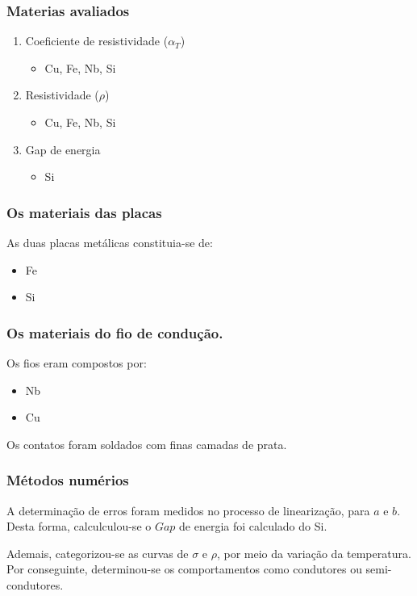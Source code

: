 \documentclass[11pt]{article}
\begin{document}
\subsubsection{Materias avaliados}
\label{sec:org3be70eb}
\begin{enumerate}
\item Coeficiente de resistividade (\(\alpha_T\))
\begin{itemize}
\item Cu, Fe, Nb, Si
\end{itemize}
\item Resistividade (\(\rho\))
\begin{itemize}
\item Cu, Fe, Nb, Si
\end{itemize}
\item Gap de energia
\begin{itemize}
\item Si
\end{itemize}
\end{enumerate}

\subsubsection{Os materiais das placas}
\label{sec:orgb54939c}
As duas placas metálicas constituia-se de:
\begin{itemize}
\item Fe
\item Si
\end{itemize}
\subsubsection{Os materiais do fio de condução.}
\label{sec:orgf1d6452}
Os fios eram compostos por:
\begin{itemize}
\item Nb
\item Cu
\end{itemize}

Os contatos foram soldados com finas camadas de prata.

\subsubsection{Métodos numérios}
\label{sec:org9708afa}
A determinação de erros foram medidos no processo de linearização,
para \(a\) e \(b\). Desta forma, calculculou-se o \(Gap\) de energia foi
calculado do Si.

Ademais, categorizou-se as curvas de \(\sigma\) e \(\rho\), por meio
da variação da temperatura. Por conseguinte, determinou-se os
comportamentos como condutores ou semi-condutores.


\end{document}
